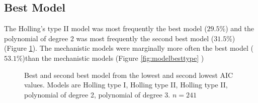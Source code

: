 \documentclass{article}
\begin{document}
\subsection{Best Model}
The Holling's type II model was most frequently the best model ($29.5\%$) and the polynomial of degree 2 was most frequently the second best model ($31.5\%$) (Figure \ref{fig:bestmodel}).
The mechanistic models were marginally more often the best model ($53.1\%$)than the mechanistic models (Figure \ref{fig:modelbesttype} )
\begin{figure}[h!]
\centering
{}
\caption{Best and second best model from the lowest and second lowest AIC values. Models are Holling type I, Holling type II, Holling type II, polynomial of degree 2, polynomial of degree 3. $n=241$}
\label{fig:bestmodel}
\end{figure}
\end{document}
